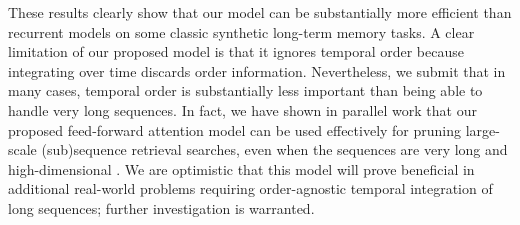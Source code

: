 \documentclass{article} %
\begin{document}
These results clearly show that our model can be substantially more efficient than recurrent models on some classic synthetic long-term memory tasks.
A clear limitation of our proposed model is that it ignores temporal order because integrating over time discards order information.
Nevertheless, we submit that in many cases, temporal order is substantially less important than being able to handle very long sequences.
In fact, we have shown in parallel work that our proposed feed-forward attention model can be used effectively for pruning large-scale (sub)sequence retrieval searches, even when the sequences are very long and high-dimensional \cite{raffel2016pruning}.
We are optimistic that this model will prove beneficial in additional real-world problems requiring order-agnostic temporal integration of long sequences; further investigation is warranted.



\end{document}
